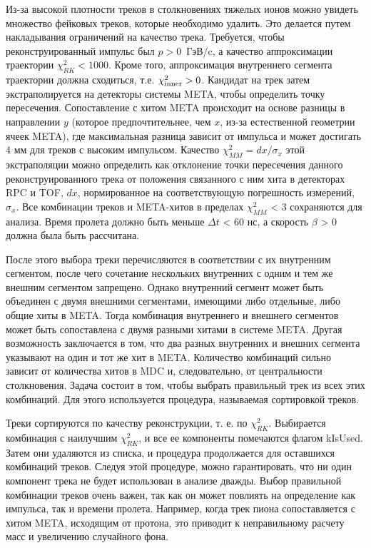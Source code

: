 Из-за высокой плотности треков в столкновениях тяжелых ионов можно увидеть множество фейковых треков, которые необходимо удалить. Это делается путем накладывания ограничений 
на качество трека. Требуется, чтобы реконструированный импульс был $p>0$~ГэВ/c, а качество аппроксимации траектории $\chi^2_{RK} < 1000$. 
Кроме того, аппроксимация внутреннего сегмента траектории должна сходиться, т.е. $\chi^2_{\rm inner} > 0$. 
Кандидат на трек затем экстраполируется на детекторы системы META, 
чтобы определить точку пересечения. Сопоставление с  хитом META происходит на основе разницы в направлении $y$ (которое предпочтительнее, чем $x$, из-за естественной геометрии ячеек META), 
где максимальная разница зависит от импульса и может достигать 4 мм для треков с высоким импульсом.
Качество $\chi^{2}_{MM}=dx/\sigma_x$  этой экстраполяции можно определить как отклонение точки пересечения данного реконструированного трека от положения связанного с ним хита в детекторах RPC и TOF, $dx$, нормированное на соответствующую погрешность измерений, $\sigma_x$.
Все комбинации треков и META-хитов в пределах $\chi^{2}_{MM}$ < 3 сохраняются для анализа.
Время пролета должно быть меньше $\Delta t$ < 60 нс, а скорость $\beta$ > 0 должна была быть рассчитана.

После этого выбора треки перечисляются в соответствии с их внутренним сегментом, после чего сочетание нескольких внутренних с одним и тем же внешним сегментом запрещено. 
Однако внутренний сегмент может быть объединен с двумя внешними сегментами, имеющими либо отдельные, либо общие хиты в META. 
Тогда комбинация внутреннего и внешнего сегментов может быть сопоставлена с двумя разными хитами в системе META. 
Другая возможность заключается в том, что два разных внутренних и внешних сегмента указывают на один и тот же хит в META. 
Количество комбинаций сильно зависит от количества хитов в MDC и, следовательно, от центральности столкновения.
Задача состоит в том, чтобы выбрать правильный трек из всех этих комбинаций. Для этого используется процедура, называемая сортировкой треков.

Треки сортируются по качеству реконструкции, т. е. по $\chi^2_{RK}$. Выбирается комбинация с наилучшим  $\chi^2_{RK}$, и все ее компоненты помечаются флагом kIsUsed. 
Затем они удаляются из списка, и процедура продолжается для оставшихся комбинаций треков.
Следуя этой процедуре, можно гарантировать, что ни один компонент трека не будет использован в анализе дважды.
Выбор правильной комбинации треков очень важен, так как он может повлиять на определение как импульса, так и времени пролета.
Например, когда трек пиона сопоставляется с хитом META, исходящим от протона, это приводит к неправильному расчету
масс и увеличению случайного фона. 

